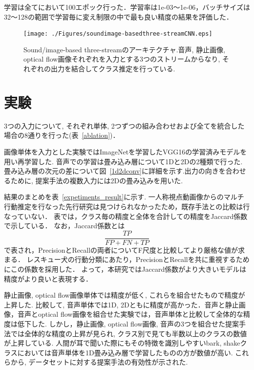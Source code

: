 \documentclass[MIRU,submit]{miru2019j}
\begin{document}
学習は全てにおいて100エポック行った．学習率は1e-03〜1e-06，バッチサイズは32〜128の範囲で学習毎に変え制限の中で最も良い精度の結果を評価した．

\begin{figure}[tb]
   \begin{center}
    \texttt{[image: ./Figures/soundimage-basedthree-streamCNN.eps]}
    \caption{Sound/image-based three-streamのアーキテクチャ.音声, 静止画像, optical flow画像それぞれを入力とする3つのストリームからなり, それぞれの出力を結合してクラス推定を行っている.}
    \label{sound3st}
   \end{center}
\end{figure}

\section{実験}

3つの入力について, それぞれ単体, 2つずつの組み合わせおよび全てを統合した場合の8通りを行った(表~\ref{ablation})．

画像単体を入力とした実験ではImageNetを学習したVGG16の学習済みモデルを用い再学習した.
音声での学習は畳み込み層について1Dと2Dの2種類で行った.
畳み込み層の次元の差について図~\ref{1d2dconv}に詳細を示す.出力の向きを合わせるために, 提案手法の複数入力には2Dの畳み込みを用いた.

結果のまとめを表~\ref{expetiments_result}に示す.
一人称視点動画像からのマルチ行動推定を行なった先行研究は見つけられなかったため，既存手法との比較は行なっていない．
表では，クラス毎の精度と全体を合計しての精度をJaccard係数で示している．
なお，Jaccard係数とは$$\frac{TP}{FP+FN+TP}$$で表され，PrecisionとRecallの両者についてF尺度と比較してより厳格な値が求まる．
レスキュー犬の行動分類にあたり，PrecisionとRecallを共に重視するためにこの係数を採用した．
よって，本研究ではJaccard係数がより大きいモデルは精度がより良いと表現する．

静止画像, optical flow画像単体では精度が低く, これらを組合せたもので精度が上昇した.
比較して, 音声単体では1D, 2Dともに精度が高かった．音声と静止画像，音声とoptical flow画像を組合せた実験では，音声単体と比較して全体的な精度は低下した.
しかし，静止画像, optical flow画像, 音声の3つを組合せた提案手法では全体的な精度の上昇が見られ, クラス別で見ても半数以上のクラスの数値が上昇している.
人間が耳で聞いた際にもその特徴を識別しやすいbark, shakeクラスにおいては音声単体を1D畳み込み層で学習したものの方が数値が高い.
これらから, データセットに対する提案手法の有効性が示された.
\end{document}
